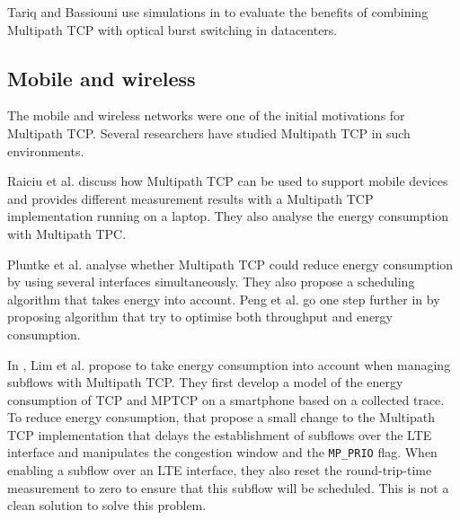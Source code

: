 Tariq and Bassiouni use simulations in \cite{Tariz_OBS:2014} to evaluate the benefits of combining Multipath TCP with optical burst switching in datacenters.

\subsection{Mobile and wireless}

The mobile and wireless networks were one of the initial motivations for Multipath TCP. Several researchers have studied Multipath TCP in such environments.

Raiciu et al. \cite{Raiciu_Opportunistic:2011} discuss how Multipath TCP can be used to support mobile devices and provides different measurement results with a Multipath TCP implementation running on a laptop. They also analyse the energy consumption with Multipath TPC.%

Pluntke et al. \cite{Pluntke_Saving:2011} analyse whether Multipath TCP could reduce energy consumption by using several interfaces simultaneously. They also propose a scheduling algorithm that takes energy into account. Peng et al. go one step further in  %
\cite{Peng_Energy:2014} by proposing algorithm that try to optimise both throughput and energy consumption. %


In \cite{Lim_Green:2014}, Lim et al. propose to take energy consumption into account when managing subflows with Multipath TCP. They first develop a model of the energy consumption of TCP and MPTCP on a smartphone based on a collected trace. To reduce energy consumption, that propose a small change to the Multipath TCP implementation that delays the establishment of subflows over the LTE interface and manipulates the congestion window and the \texttt{MP\_PRIO} flag. When enabling a subflow over an LTE interface, they also reset the round-trip-time measurement to zero to ensure that this subflow will be scheduled. This is not a clean solution to solve this problem.

